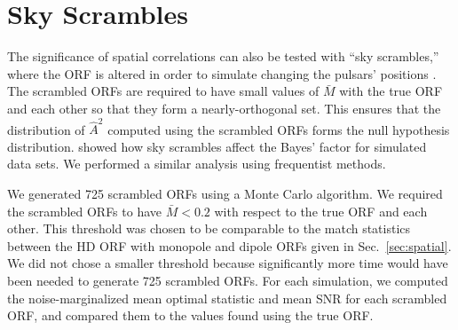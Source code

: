 \documentclass[twocolumn,aps,prd,superscriptaddress]{revtex4-1}
\begin{document}
\section{Sky Scrambles}
\label{sec:skyscrambles}

The significance of spatial correlations can also be tested with ``sky scrambles,'' 
where the ORF is altered in order to simulate changing the pulsars' positions \citep{cs2016,tlb+2017}. 
The scrambled ORFs are required to have small values of $\bar{M}$ 
with the true ORF and each other so that they form a nearly-orthogonal set. 
This ensures that the distribution of $\hat{A}^2$ computed using the scrambled ORFs 
forms the null hypothesis distribution. 
\citet{tlb+2017} showed how sky scrambles affect the Bayes' factor for simulated data sets. 
We performed a similar analysis using frequentist methods.

We generated 725 scrambled ORFs 
using a Monte Carlo algorithm. 
We required the scrambled ORFs to have $\bar{M} < 0.2$ 
with respect to the true ORF and each other. 
This threshold was chosen to be comparable to the match statistics 
between the HD ORF with monopole and dipole ORFs 
given in Sec.~\ref{sec:spatial}. 
We did not chose a smaller threshold because significantly more time 
would have been needed to generate 725 scrambled ORFs. 
For each simulation, we computed the 
noise-marginalized mean optimal statistic and mean SNR 
for each scrambled ORF, 
and compared them to the values found using the true ORF.
\end{document}
